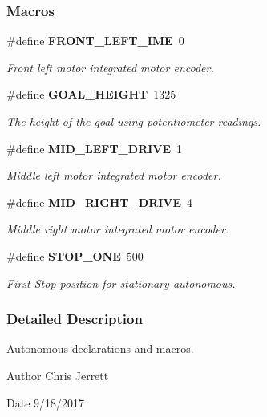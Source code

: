 \subsubsection*{Macros}
\begin{DoxyCompactItemize}
\item 
\#define \textbf{ F\+R\+O\+N\+T\+\_\+\+L\+E\+F\+T\+\_\+\+I\+ME}~0
\begin{DoxyCompactList}\small\item\em Front left motor integrated motor encoder. \end{DoxyCompactList}\item 
\#define \textbf{ G\+O\+A\+L\+\_\+\+H\+E\+I\+G\+HT}~1325
\begin{DoxyCompactList}\small\item\em The height of the goal using potentiometer readings. \end{DoxyCompactList}\item 
\#define \textbf{ M\+I\+D\+\_\+\+L\+E\+F\+T\+\_\+\+D\+R\+I\+VE}~1
\begin{DoxyCompactList}\small\item\em Middle left motor integrated motor encoder. \end{DoxyCompactList}\item 
\#define \textbf{ M\+I\+D\+\_\+\+R\+I\+G\+H\+T\+\_\+\+D\+R\+I\+VE}~4
\begin{DoxyCompactList}\small\item\em Middle right motor integrated motor encoder. \end{DoxyCompactList}\item 
\#define \textbf{ S\+T\+O\+P\+\_\+\+O\+NE}~500
\begin{DoxyCompactList}\small\item\em First Stop position for stationary autonomous. \end{DoxyCompactList}\end{DoxyCompactItemize}


\subsubsection{Detailed Description}
Autonomous declarations and macros. 

\begin{DoxyAuthor}{Author}
Chris Jerrett 
\end{DoxyAuthor}
\begin{DoxyDate}{Date}
9/18/2017 
\end{DoxyDate}


